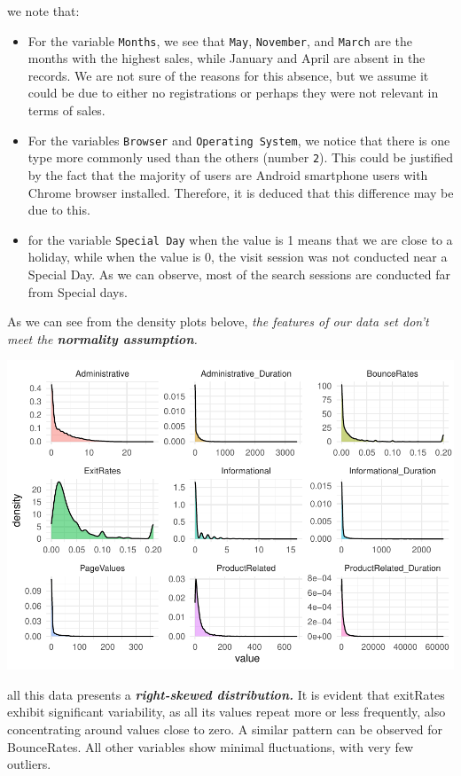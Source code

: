 \documentclass[
]{article}
\begin{document}
we note that:

\begin{itemize}
\item
  For the variable \texttt{Months}, we see that \texttt{May},
  \texttt{November}, and \texttt{March} are the months with the highest
  sales, while January and April are absent in the records. We are not
  sure of the reasons for this absence, but we assume it could be due to
  either no registrations or perhaps they were not relevant in terms of
  sales.
\item
  For the variables \texttt{Browser} and \texttt{Operating\ System}, we
  notice that there is one type more commonly used than the others
  (number \texttt{2}). This could be justified by the fact that the
  majority of users are Android smartphone users with Chrome browser
  installed. Therefore, it is deduced that this difference may be due to
  this.
\item
  for the variable \texttt{Special\ Day} when the value is 1 means that
  we are close to a holiday, while when the value is 0, the visit
  session was not conducted near a Special Day. As we can observe, most
  of the search sessions are conducted far from Special days.
\end{itemize}

As we can see from the density plots belove, \emph{the features of our
data set don't meet the \textbf{normality assumption}.}

\includegraphics{report_official_files/figure-latex/unnamed-chunk-6-1.pdf}

all this data presents a \textbf{\emph{right-skewed distribution.}} It
is evident that exitRates exhibit significant variability, as all its
values repeat more or less frequently, also concentrating around values
close to zero. A similar pattern can be observed for BounceRates. All
other variables show minimal fluctuations, with very few outliers.
\end{document}
